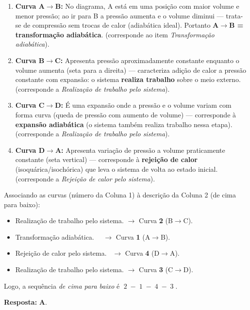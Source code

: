 \begin{flushleft}
\begin{enumerate}
    \item \textbf{Curva A$\to$B:} No diagrama, A est\'a em uma posi\c{c}\~ao com maior volume e menor press\~ao; ao ir para B a press\~ao aumenta e o volume diminui — trata-se de compress\~ao sem trocas de calor (adiab\'atica ideal). Portanto \textbf{A$\to$B = transforma\c{c}\~ao adiab\'atica}. (corresponde ao item \emph{Transformação adiabática}).
    \item \textbf{Curva B$\to$C:} Apresenta press\~ao aproximadamente constante enquanto o volume aumenta (seta para a direita) — caracteriza adi\c{c}\~ao de calor a press\~ao constante com expans\~ao: o sistema \textbf{realiza trabalho} sobre o meio externo. (corresponde a \emph{Realização de trabalho pelo sistema}).
    \item \textbf{Curva C$\to$D:} \'E uma expans\~ao onde a press\~ao e o volume variam com forma curva (queda de press\~ao com aumento de volume) — 
    corresponde \`a \textbf{expans\~ao adiab\'atica} (o sistema tamb\'em realiza trabalho nessa etapa). (corresponde a \emph{Realização de trabalho pelo sistema}).
    \item \textbf{Curva D$\to$A:} Apresenta varia\c{c}\~ao de press\~ao a volume praticamente constante (seta vertical) — corresponde \`a \textbf{rejei\c{c}\~ao de calor} (isoqu\'arica/isoch\'orica) que leva o sistema de volta ao estado inicial. (corresponde a \emph{Rejeição de calor pelo sistema}).
\end{enumerate}

Associando as curvas (n\'umero da Coluna 1) \`a descri\c{c}\~ao da Coluna 2 (de cima para baixo):

\begin{itemize}
    \item Realiza\c{c}\~ao de trabalho pelo sistema. \quad $\to$ Curva \textbf{2} (B$\to$C).
    \item Transformação adiabática. \quad\quad\quad\quad\ \ $\to$ Curva \textbf{1} (A$\to$B).
    \item Rejeição de calor pelo sistema. \quad\quad\ $\to$ Curva \textbf{4} (D$\to$A).
    \item Realiza\c{c}\~ao de trabalho pelo sistema. \quad $\to$ Curva \textbf{3} (C$\to$D).
\end{itemize}

Logo, a sequ\^encia \emph{de cima para baixo} \'e \(\;2\;-\;1\;-\;4\;-\;3\;\).

\vspace{0.3cm}

\textbf{Resposta:} \colorbox{green!50}{\textbf{A}}.

\end{flushleft}

